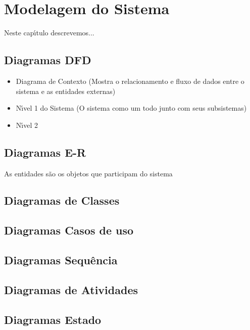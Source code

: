 
\chapter{Modelagem do Sistema}

Neste cap\'{\i}tulo descrevemos...


    \section{Diagramas DFD}

    \begin{itemize}
      \item Diagrama de Contexto (Mostra o relacionamento e fluxo de dados entre o sistema e as entidades externas)

      \item N\'{\i}vel 1 do Sistema (O sistema como um todo junto com seus subsistemas)

      \item N\'{\i}vel 2

    \end{itemize}


    \section{Diagramas E-R}
    As entidades s\~{a}o os objetos que participam do sistema

    \section{Diagramas de Classes}

    \section{Diagramas Casos de uso}

    \section{Diagramas Sequ\^{e}ncia}

    \section{Diagramas de Atividades}

    \section{Diagramas Estado}

